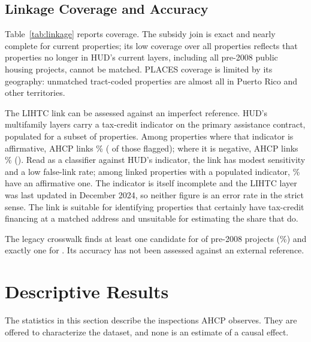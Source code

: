 \documentclass[10pt,twocolumn,letterpaper]{article}
\begin{document}
\subsection{Linkage Coverage and Accuracy}
\begin{table}[t]
\caption{Linkage coverage}\label{tab:linkage}
\centering\footnotesize
\resizebox{\columnwidth}{!}{}
\end{table}
Table~\ref{tab:linkage} reports coverage. The subsidy join is exact and nearly complete for current properties; its low coverage over all properties reflects that properties no longer in HUD's current layers, including all pre-2008 public housing projects, cannot be matched. PLACES coverage is limited by its geography: unmatched tract-coded properties are almost all in Puerto Rico and other territories.

The LIHTC link can be assessed against an imperfect reference. HUD's multifamily layers carry a tax-credit indicator on the primary assistance contract, populated for a subset of properties. Among properties where that indicator is affirmative, AHCP links \lihtcSens\% (\lihtcYLinked{} of those flagged); where it is negative, AHCP links \lihtcFalse\% (\lihtcNLinked{}). Read as a classifier against HUD's indicator, the link has modest sensitivity and a low false-link rate; among linked properties with a populated indicator, \lihtcPPV\% have an affirmative one. The indicator is itself incomplete and the LIHTC layer was last updated in December 2024, so neither figure is an error rate in the strict sense. The link is suitable for identifying properties that certainly have tax-credit financing at a matched address and unsuitable for estimating the share that do.

The legacy crosswalk finds at least one candidate for \legacyAny{} of \legacyTotal{} pre-2008 projects (\legacyAnyPct\%) and exactly one for \legacyUnique{}. Its accuracy has not been assessed against an external reference.

\section{Descriptive Results}\label{sec:results}
The statistics in this section describe the inspections AHCP observes. They are offered to characterize the dataset, and none is an estimate of a causal effect.
\end{document}
